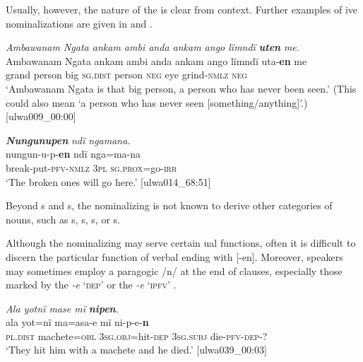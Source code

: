 Usually, however, the nature of the  is clear from context. Further examples of  ive nominalizations are given in  and .

\ea%
    \label{ex:nouns:39}

          \textit{Ambawanam Ngata ankam ambi anda ankam ango lïmndï} \textbf{\textit{uten}} \textit{me.}\\

    \gll Ambawanam  Ngata  ankam  ambi  anda    ankam  ango  lïmndï  uta-\textbf{en}       me\\
    [name]      grand  person  big    \textsc{sg.dist }  person  \textsc{neg} eye    grind-\textsc{nmlz}  \textsc{neg}\\


\glt `Ambawanam Ngata is that big person, a person who has never been seen.’ (This could also mean ‘a person who   has never seen [something/anything]’.) [ulwa009\_00:00]
\z

\ea%
    \label{ex:nouns:40}
          \textbf{\textit{Nungunupen}} \textit{ndï ngamana.}\\
\gll    nungun-u-p-\textbf{en}    ndï  nga=ma-na\\
    break-put-\textsc{pfv-nmlz}  3\textsc{pl}  \textsc{sg.prox}=go-\textsc{irr}\\
\glt `The broken ones will go here.’ [ulwa014\_68:51]
\z


Beyond s and s, the nominalizing  is not known to derive other  categories of nouns, such as s, s, s, or s.

  Although the nominalizing  may serve certain ual functions, often it is difficult to discern the particular function of verbal ending with [\nobreakdash-en]. Moreover, speakers may sometimes employ a  paragogic /n/ at the end of clauses, especially those marked by the  \textit{-e} ‘\textsc{dep}’  or the    \textit{-e} ‘\textsc{ipfv}’ .

\ea%
    \label{ex:nouns:41}
          \textit{Ala yotnï mase mï} \textbf{\textit{nipen}}.\\
\gll ala      yot=nï      ma=asa-e      mï      ni-p-e-\textbf{n}\\
    \textsc{pl.dist}  machete=\textsc{obl}  3\textsc{sg.obj}=hit-\textsc{dep}  3\textsc{sg.subj}  die-\textsc{pfv-dep}{}-?\\
\glt `They hit him with a machete and he died.’ [ulwa039\_00:03]
\z

